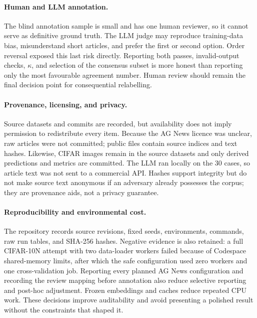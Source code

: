 \documentclass[11pt]{article}
\begin{document}
\paragraph{Human and LLM annotation.}
The blind annotation sample is small and has one human reviewer, so it cannot
serve as definitive ground truth. The LLM judge may reproduce training-data
bias, misunderstand short articles, and prefer the first or second option.
Order reversal exposed this last risk directly. Reporting both passes,
invalid-output checks, $\kappa$, and selection of the consensus subset is more
honest than reporting only the most favourable agreement number. Human review
should remain the final decision point for consequential relabelling.

\paragraph{Provenance, licensing, and privacy.}
Source datasets and commits are recorded, but availability does not imply
permission to redistribute every item. Because the AG News licence was unclear,
raw articles were not committed; public files contain source indices and text
hashes. Likewise, CIFAR images remain in the source datasets and only derived
predictions and metrics are committed. The LLM ran locally on the 30 cases, so
article text was not sent to a commercial API. Hashes support integrity but do
not make source text anonymous if an adversary already possesses the corpus;
they are provenance aids, not a privacy guarantee.

\paragraph{Reproducibility and environmental cost.}
The repository records source revisions, fixed seeds, environments, commands,
raw run tables, and SHA-256 hashes. Negative evidence is also retained: a full
CIFAR-10N attempt with two data-loader workers failed because of Codespace
shared-memory limits, after which the safe configuration used zero workers and
one cross-validation job. Reporting every planned AG News configuration and
recording the review mapping before annotation also reduce selective reporting
and post-hoc adjustment. Frozen embeddings and caches reduce repeated CPU work.
These decisions improve auditability and avoid presenting a polished result
without the constraints that shaped it.
\end{document}
